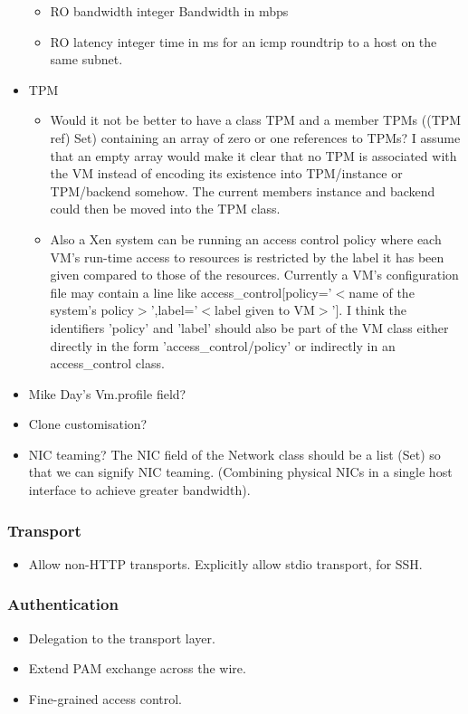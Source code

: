 \begin{itemize}
\begin{itemize}
\item RO bandwidth integer Bandwidth in mbps
\item RO latency integer time in ms for an icmp roundtrip to a host on the
same subnet.

\end{itemize}

\item TPM
\begin{itemize}

\item Would it not be better to have a class TPM and a member TPMs ((TPM ref)
Set) containing an array of zero or one references to TPMs? I assume that
an empty array would make it clear that no TPM is associated with the VM
instead of encoding its existence into TPM/instance or TPM/backend
somehow. The current members instance and backend could then be moved into
the TPM class.

\item Also a Xen system can be running an access control policy where each
VM's run-time access to resources is restricted by the label it has been given
compared to those of the resources. Currently a VM's configuration file may
contain a line like access\_control[policy='$<$name of the system's
policy$>$',label='$<$label given to VM$>$'].  I think the identifiers 'policy'
and 'label' should also be part of the VM class either directly in the form
'access\_control/policy' or indirectly in an access\_control class.

\end{itemize}

\item Mike Day's Vm.profile field?

\item Clone customisation?

\item NIC teaming?  The NIC field of the Network class should be a list (Set)
so that we can signify NIC teaming. (Combining physical NICs in a single host
interface to achieve greater bandwidth).

\end{itemize}

\subsubsection{Transport}

\begin{itemize}

\item Allow non-HTTP transports.  Explicitly allow stdio transport, for SSH.

\end{itemize}

\subsubsection{Authentication}

\begin{itemize}

\item Delegation to the transport layer.

\item Extend PAM exchange across the wire.

\item Fine-grained access control.

\end{itemize}
